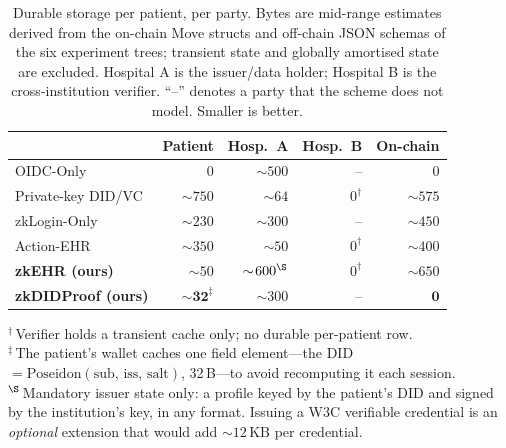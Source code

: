 \begin{table}[t]
  \centering
  \small
  \caption{Durable storage per patient, per party. Bytes are mid-range
    estimates derived from the on-chain Move structs and off-chain JSON
    schemas of the six experiment trees; transient state and globally
    amortised state are excluded. Hospital A is the issuer/data holder;
    Hospital B is the cross-institution verifier. ``--'' denotes a party
    that the scheme does not model. Smaller is better.}
  \label{tab:storage-comparison}
  \begin{tabular}{lrrrr}
    \toprule
                                  & Patient & Hosp.\ A          & Hosp.\ B           & On-chain \\
    \midrule
    OIDC-Only                     & $0$           & $\sim\!500$       & --                 & $0$        \\
    Private-key DID/VC            & $\sim\!750$   & $\sim\!64$        & $0^{\dagger}$      & $\sim\!575$ \\
    zkLogin-Only                  & $\sim\!230$   & $\sim\!300$       & --                 & $\sim\!450$ \\
    Action-EHR                    & $\sim\!350$   & $\sim\!50$        & $0^{\dagger}$      & $\sim\!400$ \\
    \textbf{zkEHR (ours)}         & $\sim\!50$    & $\sim\!600^{\S}$  & $0^{\dagger}$      & $\sim\!650$ \\
    \textbf{zkDIDProof (ours)}    & $\mathbf{\sim\!32^{\ddagger}}$ & $\sim\!300$ & --       & $\mathbf{0}$ \\
    \bottomrule
  \end{tabular}
  \par\medskip
  {\footnotesize $^{\dagger}$\,Verifier holds a transient cache only; no
    durable per-patient row.\\
    $^{\ddagger}$\,The patient's wallet caches one field element---the
    DID $=\mathrm{Poseidon}(\mathrm{sub},\,\mathrm{iss},\,\mathrm{salt})$,
    32\,B---to avoid recomputing it each session.\\
    $^{\S}$\,Mandatory issuer state only: a profile keyed by the
    patient's DID and signed by the institution's key, in any format.
    Issuing a W3C verifiable credential is an \emph{optional} extension
    that would add $\sim\!12\,\mathrm{KB}$ per credential.}
\end{table}

